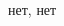 \begin{solution}{6.91}

\end{solution}
\begin{solution}{6.92}

\end{solution}
\begin{solution}{6.93}

\end{solution}
\begin{solution}{6.94}

\end{solution}
\begin{solution}{6.95}

\end{solution}
\begin{solution}{6.96}

\end{solution}
\begin{solution}{6.97}

\end{solution}
\begin{solution}{6.98}
нет, нет
\end{solution}
\begin{solution}{6.99}

\end{solution}
\begin{solution}{6.100}

\end{solution}
\begin{solution}{6.101}

\end{solution}
\begin{solution}{6.102}

\end{solution}
\begin{solution}{6.103}

\end{solution}
\begin{solution}{6.104}

\end{solution}
\begin{solution}{6.105}

\end{solution}
\begin{solution}{6.106}

\end{solution}
\begin{solution}{6.107}

\end{solution}
